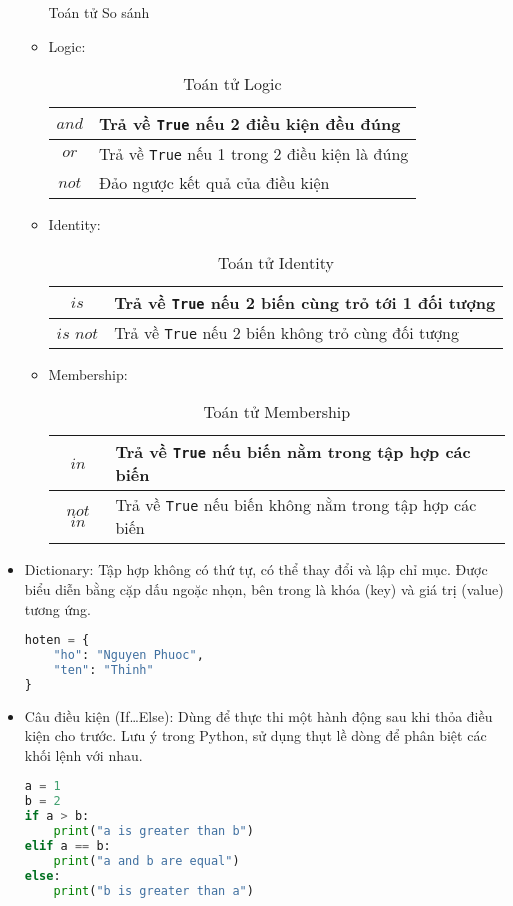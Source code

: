 \begin{itemize}
\begin{itemize}
\begin{table}[!ht]
			\caption{Toán tử So sánh}
		\end{table}
		\item Logic:
		\begin{table}[!ht]
			\centering
			\begin{tabular}{|c|l|}
				\hline
				$and$ & Trả về \texttt{True} nếu 2 điều kiện đều đúng\\
				\hline
				$or$ & Trả về \texttt{True} nếu 1 trong 2 điều kiện là đúng\\
				\hline
				$not$ & Đảo ngược kết quả của điều kiện\\
				\hline
			\end{tabular}
			\caption{Toán tử Logic}
		\end{table}
		\item Identity:
		\begin{table}[!ht]
			\centering
			\begin{tabular}{|c|l|}
				\hline
				$is$ & Trả về \texttt{True} nếu 2 biến cùng trỏ tới 1 đối tượng\\
				\hline
				$is$ $not$ & Trả về \texttt{True} nếu 2 biến không trỏ cùng đối tượng\\
				\hline
			\end{tabular}
			\caption{Toán tử Identity}
		\end{table}
		\item Membership:
		\begin{table}[!ht]
			\centering
			\begin{tabular}{|c|l|}
				\hline
				$in$ & Trả về \texttt{True} nếu biến nằm trong tập hợp các biến\\
				\hline
				$not$ $in$ & Trả về \texttt{True} nếu biến không nằm trong tập hợp các biến\\
				\hline
			\end{tabular}
			\caption{Toán tử Membership}
		\end{table}
	\end{itemize}
	\item Dictionary: Tập hợp không có thứ tự, có thể thay đổi và lập chỉ mục. Được biểu diễn bằng cặp dấu ngoặc nhọn, bên trong là khóa (key) và giá trị (value) tương ứng.
	\begin{lstlisting}[language=Python]
hoten = {
	"ho": "Nguyen Phuoc",
	"ten": "Thinh"
}
	\end{lstlisting}
	\item Câu điều kiện (If\ldots Else): Dùng để thực thi một hành động sau khi thỏa điều kiện cho trước. Lưu ý trong Python, sử dụng thụt lề dòng để phân biệt các khối lệnh với nhau.
	\begin{lstlisting}[language=Python]
a = 1
b = 2
if a > b:
	print("a is greater than b")
elif a == b:
	print("a and b are equal")
else:
	print("b is greater than a")


\end{lstlisting}
\end{itemize}
